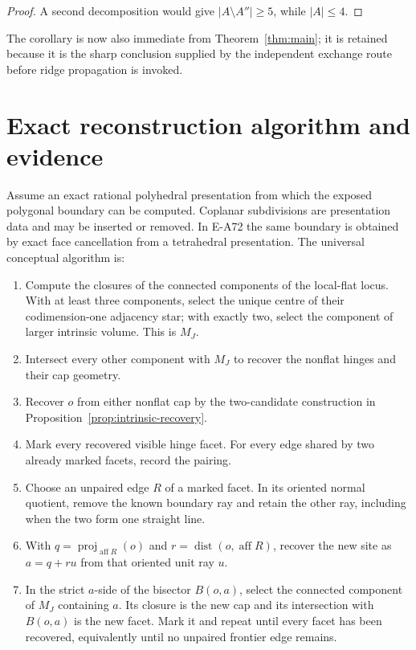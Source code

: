 \documentclass[11pt]{amsart}
\theoremstyle{definition}
\newcommand{\aff}{\operatorname{aff}}
\newcommand{\dist}{\operatorname{dist}}
\begin{document}
\begin{proof}
A second decomposition would give $|A\setminus A''|\ge5$, while
$|A|\le4$.
\end{proof}

The corollary is now also immediate from Theorem~\ref{thm:main}; it is retained
because it is the sharp conclusion supplied by the independent exchange
route before ridge propagation is invoked.

\section{Exact reconstruction algorithm and evidence}
\label{sec:algorithm}

Assume an exact rational polyhedral presentation from which the exposed
polygonal boundary can be computed.  Coplanar subdivisions are presentation
data and may be inserted or removed.  In E-A72 the same boundary is obtained
by exact face cancellation from a tetrahedral presentation.  The universal
conceptual algorithm is:

\begin{enumerate}[label=\arabic*.]
\item Compute the closures of the connected components of the local-flat
locus.  With at least three components, select the unique centre of their
codimension-one adjacency star; with exactly two, select the component of
larger intrinsic volume.  This is $M_J$.
\item Intersect every other component with $M_J$ to recover the nonflat hinges
and their cap geometry.
\item Recover $o$ from either nonflat cap by the two-candidate construction in
Proposition~\ref{prop:intrinsic-recovery}.
\item Mark every recovered visible hinge facet.  For every edge shared by two
already marked facets, record the pairing.
\item Choose an unpaired edge $R$ of a marked facet.  In its oriented normal
quotient, remove the known boundary ray and retain the other ray, including
when the two form one straight line.
\item With $q=\operatorname{proj}_{\aff R}(o)$ and
$r=\dist(o,\aff R)$, recover the new site as $a=q+ru$ from that oriented unit
ray $u$.
\item In the strict $a$-side of the bisector $B(o,a)$, select the connected
component of $M_J$ containing $a$.  Its closure is the new cap and its
intersection with $B(o,a)$ is the new facet.  Mark it and repeat until every
facet has been recovered, equivalently until no unpaired frontier edge remains.
\end{enumerate}
\end{document}
